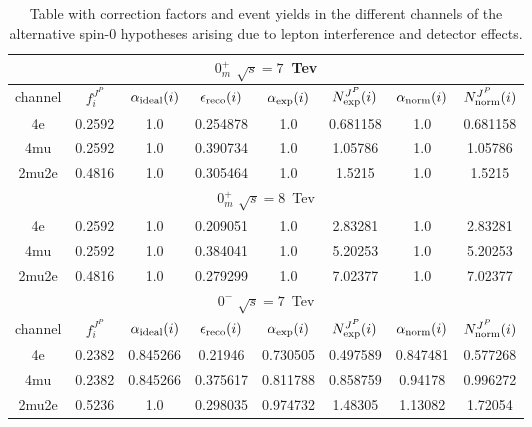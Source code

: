 \begin{table}[b]
\centering
\caption{
Table with correction factors and event yields in the different
channels of the alternative spin-0 hypotheses arising
due to lepton interference and detector effects.}
\centering %
\begin{tabular}{c c c c c c c c} %
\hline \hline

 \multicolumn{8}{|c|}{$0^{+}_{m}$ $\sqrt{s}=7$~Tev} \\ \hline 

channel & $f_{i}^{J^P}$ & $\alpha_{\rm ideal} (i)$ & $\epsilon_{\rm reco} (i)$ & $\alpha_{\rm exp} (i)$ & $N^{J^P}_{\rm exp} (i)$ & $\alpha_{\rm norm} (i)$ & $N^{J^P}_{\rm norm} (i)$\\ \hline 
4e & 0.2592 &  1.0  & 0.254878 &  1.0  & 0.681158 &  1.0  & 0.681158 \\ \hline 
4mu & 0.2592 &  1.0  & 0.390734 &  1.0  & 1.05786 &  1.0  & 1.05786 \\ \hline 
2mu2e & 0.4816 &  1.0  & 0.305464 &  1.0  & 1.5215 &  1.0  & 1.5215 \\ \hline \hline 

 \multicolumn{8}{|c|}{$0^{+}_{m}$ $\sqrt{s}=8$~Tev} \\ \hline 

4e & 0.2592 &  1.0  & 0.209051 &  1.0  & 2.83281 &  1.0  & 2.83281 \\ \hline 
4mu & 0.2592 &  1.0  & 0.384041 &  1.0  & 5.20253 &  1.0  & 5.20253 \\ \hline 
2mu2e & 0.4816 &  1.0  & 0.279299 &  1.0  & 7.02377 &  1.0  & 7.02377 \\ \hline \hline  

\multicolumn{8}{|c|}{$0^{-}$ $\sqrt{s}=7$~Tev} \\ \hline

channel & $f_{i}^{J^P}$ & $\alpha_{\rm ideal} (i)$ & $\epsilon_{\rm reco} (i)$ & $\alpha_{\rm exp} (i)$ & $N^{J^P}_{\rm exp} (i)$ & $\alpha_{\rm norm} (i)$ & $N^{J^P}_{\rm norm} (i)$\\ \hline 
4e & 0.2382 & 0.845266 & 0.21946 & 0.730505
 & 0.497589%
 & 0.847481 & 0.577268 \\ \hline 
4mu & 0.2382 & 0.845266 & 0.375617 & 0.811788
 & 0.858759%
 & 0.94178 & 0.996272 \\ \hline 
2mu2e & 0.5236 & 1.0  & 0.298035 & 0.974732
 & 1.48305%
 & 1.13082 & 1.72054 \\ \hline \hline 


\end{tabular}
\end{table}
